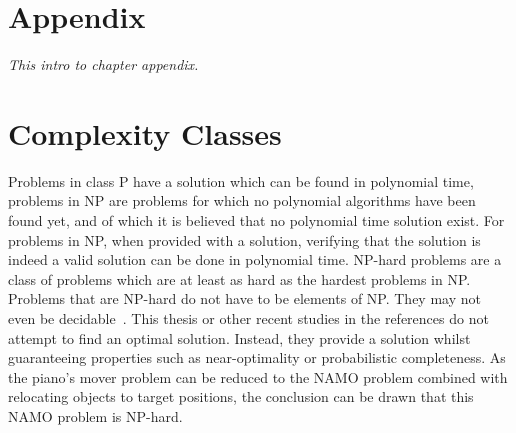 \chapter{Appendix}%
\label{chap:appendix}

\appendix

\textit{This intro to chapter appendix.\bs}

%

\chapter{Complexity Classes}%
\label{chap:appendix_complexity_classes}
Problems in class P have a solution which can be found in polynomial time, problems in \ac{NP} are problems for which no polynomial algorithms have been found yet, and of which it is believed that no polynomial time solution exist. For problems in \ac{NP}, when provided with a solution, verifying that the solution is indeed a valid solution can be done in polynomial time. \ac{NP-hard} problems are a class of problems which are at least as hard as the hardest problems in \ac{NP}. Problems that are \ac{NP-hard} do not have to be elements of NP. They may not even be decidable~\cite{pokharel_computational_2020}. This thesis or other recent studies in the references do not attempt to find an optimal solution. Instead, they provide a solution whilst guaranteeing properties such as near-optimality or probabilistic completeness. As the piano's mover problem can be reduced to the \ac{NAMO} problem combined with relocating objects to target positions, the conclusion can be drawn that this \ac{NAMO} problem is \ac{NP-hard}.\bs

